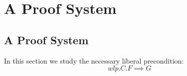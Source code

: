 \chapter{A Proof System}\label{ch:system} %

\section{A Proof System}
In this section we study the necessary liberal precondition: 
$$wlp.C.F\implies G$$

